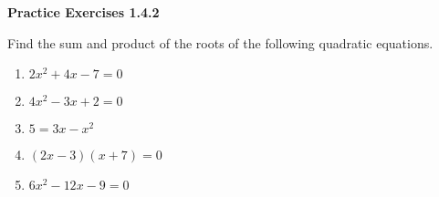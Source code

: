 \noindent\textbf{Practice Exercises 1.4.2}

\vspace{0.75ex}

Find the sum and product of the roots of the following quadratic equations.
\begin{enumerate}[label = \color{blue}\arabic*. ]
   \item $ 2x^2 + 4x - 7 = 0 $
   \item $ 4x^2 - 3x + 2 = 0 $
   \item $ 5 = 3x - x^2 $
   \item $ (2x - 3)(x + 7) = 0 $
   \item $ 6x^2 - 12x - 9 = 0 $
\end{enumerate}


